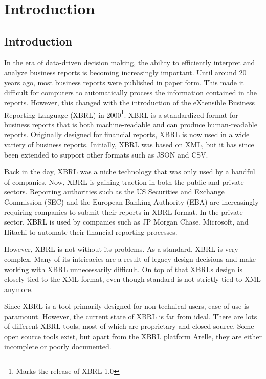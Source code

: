 \chapter{Introduction}
\label{sec:introduction}

\section{Introduction}


In the era of data-driven decision making, the ability to efficiently interpret and analyze business reports is becoming increasingly important.
Until around 20 years ago, most business reports were published in paper form.
This made it difficult for computers to automatically process the information contained in the reports.
However, this changed with the introduction of the eXtensible Business Reporting Language (XBRL) in 2000\cite{aicpa_xbrl_story}\footnote{Marks the release of XBRL 1.0}.
XBRL is a standardized format for business reports that is both machine-readable and can produce human-readable reports.
Originally designed for financial reports, XBRL is now used in a wide variety of business reports.\cite{xbrl_about}
Initially, XBRL was based on XML, but it has since been extended to support other formats such as JSON and CSV.

Back in the day, XBRL was a niche technology that was only used by a handful of companies.
Now, XBRL is gaining traction in both the public and private sectors.
Reporting authorities such as the US Securities and Exchange Commission (SEC) and the European Banking Authority (EBA)\cite{eba_reporting_frameworks} are increasingly requiring companies to submit their reports in XBRL format.\cite{sec_ixbrl}
In the private sector, XBRL is used by companies such as JP Morgan Chase, Microsoft, and Hitachi to automate their financial reporting processes.\cite{pwc2002thejournal}

However, XBRL is not without its problems.
As a standard, XBRL is very complex.
Many of its intricacies are a result of legacy design decisions and make working with XBRL unnecessarily difficult.
On top of that XBRLs design is closely tied to the XML format, even though standard is not strictly tied to XML anymore.

Since XBRL is a tool primarily designed for non-technical users, ease of use is paramount.
However, the current state of XBRL is far from ideal.
There are lots of different XBRL tools, most of which are proprietary and closed-source.
Some open source tools exist, but apart from the XBRL platform Arelle\cite{arelle}, they are either incomplete or poorly documented.

